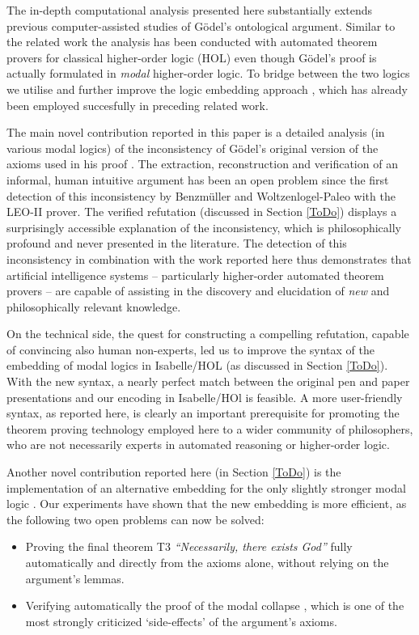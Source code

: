 \documentclass{article}
\begin{document}
The in-depth computational analysis presented here substantially
extends previous computer-assisted studies of G\"odel's ontological
argument. Similar to the related work \cite{J30,C40} the analysis has
been conducted with automated theorem provers for classical
higher-order logic (HOL) even though G\"odel's proof is actually
formulated in \emph{modal} higher-order logic. To bridge between the two
logics we utilise and further improve the logic embedding
approach \cite{J23,C40}, which has already been employed succesfully in preceding related work.


The main novel contribution reported in this paper is a detailed analysis (in various modal logics) 
of the inconsistency of G\"{o}del's original version of the axioms used in his proof 
. The extraction, reconstruction and verification of an informal, 
human intuitive argument has been an open problem since the first detection of this inconsistency 
by Benzm\"uller and Woltzenlogel-Paleo  with the LEO-II prover. 
The verified refutation (discussed in Section \ref{ToDo}) displays a surprisingly accessible
explanation of the inconsistency, which is philosophically
profound and never presented in the
literature. The detection of this inconsistency in combination with
the work reported here thus demonstrates that artificial intelligence systems 
-- particularly higher-order automated theorem provers -- 
are capable of assisting in the discovery and elucidation of
\emph{new} and philosophically relevant knowledge. 

On the technical side, the quest for constructing a compelling refutation, 
capable of convincing also human non-experts, led us to improve the 
syntax of the embedding of modal logics in
Isabelle/HOL (as discussed in Section  \ref{ToDo}). With the new syntax, a nearly perfect match
between the original pen and paper presentations and our encoding in
Isabelle/HOl is feasible. A more user-friendly syntax, as reported here, is clearly an important prerequisite
for promoting the theorem proving technology employed here to a wider community of
philosophers, who are not necessarily experts in automated reasoning or higher-order logic.

Another novel contribution reported here (in Section \ref{ToDo}) is the implementation of an alternative embedding for the only slightly stronger modal logic \SFiveU. Our experiments have shown that the new embedding is more efficient, as the following two open problems can now be solved:
\begin{itemize}
\item Proving the final theorem T3 \textit{``Necessarily, there
    exists God''} fully automatically and directly from the axioms alone, without relying on the argument's lemmas.
\item Verifying automatically the proof of the modal
  collapse \cite{Sobel}, which is one of the most strongly criticized
  `side-effects' of the argument's axioms.
\end{itemize}
\end{document}
